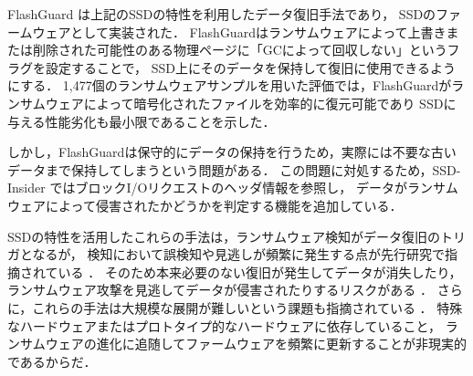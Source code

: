 FlashGuard \cite{huang2017flashguard} は上記のSSDの特性を利用したデータ復旧手法であり，
SSDのファームウェアとして実装された．
FlashGuardはランサムウェアによって上書きまたは削除された可能性のある物理ページに「GCによって回収しない」というフラグを設定することで，
SSD上にそのデータを保持して復旧に使用できるようにする．
1,477個のランサムウェアサンプルを用いた評価では，FlashGuardがランサムウェアによって暗号化されたファイルを効率的に復元可能であり
SSDに与える性能劣化も最小限であることを示した．

しかし，FlashGuardは保守的にデータの保持を行うため，実際には不要な古いデータまで保持してしまうという問題がある．
この問題に対処するため，SSD-Insider \cite{baek2018ssd} ではブロックI/Oリクエストのヘッダ情報を参照し，
データがランサムウェアによって侵害されたかどうかを判定する機能を追加している．

SSDの特性を活用したこれらの手法は，ランサムウェア検知がデータ復旧のトリガとなるが，
検知において誤検知や見逃しが頻繁に発生する点が先行研究で指摘されている \cite{han2020effectiveness}．
そのため本来必要のない復旧が発生してデータが消失したり，ランサムウェア攻撃を見逃してデータが侵害されたりするリスクがある \cite{css2024-enomoto}．
さらに，これらの手法は大規模な展開が難しいという課題も指摘されている \cite{wang2024ransom}．
特殊なハードウェアまたはプロトタイプ的なハードウェアに依存していること，
ランサムウェアの進化に追随してファームウェアを頻繁に更新することが非現実的であるからだ．

